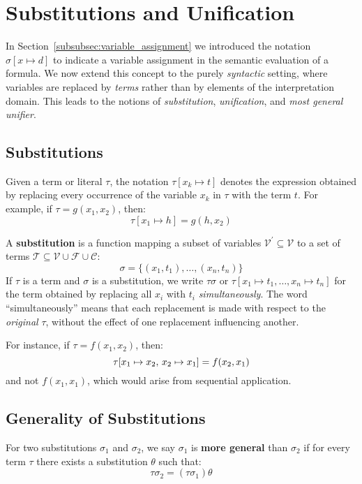 \section{Substitutions and Unification}
In Section~\ref{subsubsec:variable_assignment} we introduced the notation \(\sigma[x \mapsto d]\) to indicate a variable assignment in the semantic evaluation of a formula. We now extend this concept to the purely \emph{syntactic} setting, where variables are replaced by \emph{terms} rather than by elements of the interpretation domain. This leads to the notions of \emph{substitution}, \emph{unification}, and \emph{most general unifier}.

\subsection{Substitutions}
Given a term or literal \(\tau\), the notation \(\tau[x_k \mapsto t]\) denotes the expression obtained by replacing every occurrence of the variable \(x_k\) in \(\tau\) with the term \(t\).  
For example, if \(\tau = g(x_1, x_2)\), then:
\begin{equation}
\tau[x_1 \mapsto h] = g(h, x_2)
\end{equation}

A \textbf{substitution} is a function mapping a subset of variables \(\mathcal{V}^{'} \subseteq \mathcal{V}\) to a set of terms \(\mathcal{T} \subseteq \mathcal{V} \cup \mathcal{F} \cup \mathcal{C}\):
\begin{equation}
\sigma = \{ (x_1, t_1), \ldots, (x_n, t_n) \}
\end{equation}
If \(\tau\) is a term and \(\sigma\) is a substitution, we write \(\tau\sigma\) or \(\tau[x_1 \mapsto t_1, \ldots, x_n \mapsto t_n]\) for the term obtained by replacing all \(x_i\) with \(t_i\) \emph{simultaneously}.  
The word “simultaneously” means that each replacement is made with respect to the \emph{original} \(\tau\), without the effect of one replacement influencing another.

For instance, if \(\tau = f(x_1, x_2)\), then:
\begin{equation}
\tau[x_1 \mapsto x_2,  \,  x_2 \mapsto x_1] = f(x_2, x_1)
\end{equation}
and not \(f(x_1, x_1)\), which would arise from sequential application.

\subsection{Generality of  Substitutions}
For two substitutions \(\sigma_1\) and \(\sigma_2\), we say \(\sigma_1\) is \textbf{more general} than \(\sigma_2\) if for every term \(\tau\) there exists a substitution \(\theta\) such that:
\begin{equation}  
  \tau\sigma_2 = (\tau\sigma_1)\theta
\end{equation}

